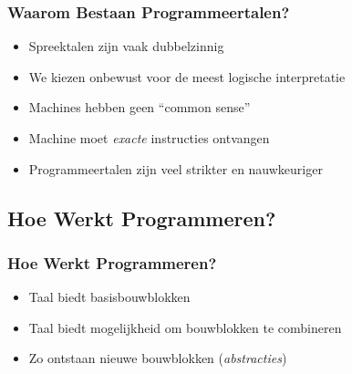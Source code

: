 \begin{frame}
  \frametitle{Waarom Bestaan Programmeertalen?}
  \begin{itemize}
    \item Spreektalen zijn vaak dubbelzinnig
    \item We kiezen onbewust voor de meest logische interpretatie
    \item Machines hebben geen ``common sense''
    \item Machine moet \emph{exacte} instructies ontvangen
    \item Programmeertalen zijn veel strikter en nauwkeuriger
  \end{itemize}
\end{frame}

\subsection{Hoe Werkt Programmeren?}

\begin{frame}
  \tableofcontents[currentsubsection]
\end{frame}

\begin{frame}
  \frametitle{Hoe Werkt Programmeren?}
  \begin{itemize}
    \item Taal biedt basisbouwblokken
    \item Taal biedt mogelijkheid om bouwblokken te combineren
    \item Zo ontstaan nieuwe bouwblokken (\emph{abstracties})
  \end{itemize}
\end{frame}

